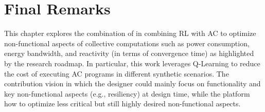 \section{Final Remarks}\label{acsos2022:sec:conclusion}

This chapter explores the combination of in combining \ac{RL} with \ac{AC} 
 to optimize non-functional aspects of collective computations such as power consumption, 
 energy bandwidth, and reactivity (in terms of convergence time) as highlighted by 
 the research roadmap. 
%
In particular, this work leverages Q-Learning 
 to reduce the cost of executing \ac{AC} programs 
 in different synthetic scenarios.
%
The contribution  vision in which 
 the designer could mainly focus on functionality and key non-functional aspects (e.g., resiliency)
 at design time, while the platform  how 
 to optimize less critical but still highly desired non-functional aspects. %


